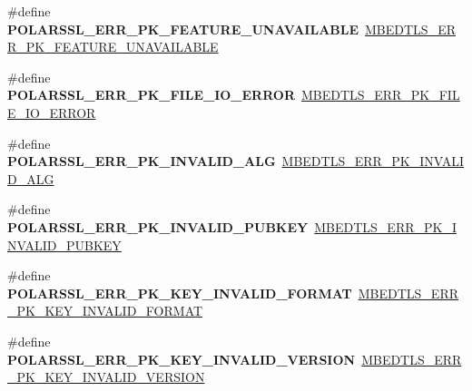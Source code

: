 \begin{DoxyCompactItemize}
\item 
\mbox{\label{compat-1_83_8h_a37a8bde8e3ed0443bba504a22e83045c}} 
\#define {\bfseries P\+O\+L\+A\+R\+S\+S\+L\+\_\+\+E\+R\+R\+\_\+\+P\+K\+\_\+\+F\+E\+A\+T\+U\+R\+E\+\_\+\+U\+N\+A\+V\+A\+I\+L\+A\+B\+LE}~\mbox{\hyperlink{pk_8h_af4a79b15d48bd86c96767db4b9ce2caf}{M\+B\+E\+D\+T\+L\+S\+\_\+\+E\+R\+R\+\_\+\+P\+K\+\_\+\+F\+E\+A\+T\+U\+R\+E\+\_\+\+U\+N\+A\+V\+A\+I\+L\+A\+B\+LE}}
\item 
\mbox{\label{compat-1_83_8h_a5e35817e1086ccdf611600128561281c}} 
\#define {\bfseries P\+O\+L\+A\+R\+S\+S\+L\+\_\+\+E\+R\+R\+\_\+\+P\+K\+\_\+\+F\+I\+L\+E\+\_\+\+I\+O\+\_\+\+E\+R\+R\+OR}~\mbox{\hyperlink{pk_8h_a334a28580efaab3c749fdf1dde28feb8}{M\+B\+E\+D\+T\+L\+S\+\_\+\+E\+R\+R\+\_\+\+P\+K\+\_\+\+F\+I\+L\+E\+\_\+\+I\+O\+\_\+\+E\+R\+R\+OR}}
\item 
\mbox{\label{compat-1_83_8h_a3f006a0485438e073549d87796d450cc}} 
\#define {\bfseries P\+O\+L\+A\+R\+S\+S\+L\+\_\+\+E\+R\+R\+\_\+\+P\+K\+\_\+\+I\+N\+V\+A\+L\+I\+D\+\_\+\+A\+LG}~\mbox{\hyperlink{pk_8h_a5d71f30a40d67d5d205a20b69303a341}{M\+B\+E\+D\+T\+L\+S\+\_\+\+E\+R\+R\+\_\+\+P\+K\+\_\+\+I\+N\+V\+A\+L\+I\+D\+\_\+\+A\+LG}}
\item 
\mbox{\label{compat-1_83_8h_ae336dc80d29e6aa980b776b54647f443}} 
\#define {\bfseries P\+O\+L\+A\+R\+S\+S\+L\+\_\+\+E\+R\+R\+\_\+\+P\+K\+\_\+\+I\+N\+V\+A\+L\+I\+D\+\_\+\+P\+U\+B\+K\+EY}~\mbox{\hyperlink{pk_8h_a0fdf1044cce5beb387d76d19bf4ef0a2}{M\+B\+E\+D\+T\+L\+S\+\_\+\+E\+R\+R\+\_\+\+P\+K\+\_\+\+I\+N\+V\+A\+L\+I\+D\+\_\+\+P\+U\+B\+K\+EY}}
\item 
\mbox{\label{compat-1_83_8h_a0af52f107aa8ae7b6e31facfd18ff44b}} 
\#define {\bfseries P\+O\+L\+A\+R\+S\+S\+L\+\_\+\+E\+R\+R\+\_\+\+P\+K\+\_\+\+K\+E\+Y\+\_\+\+I\+N\+V\+A\+L\+I\+D\+\_\+\+F\+O\+R\+M\+AT}~\mbox{\hyperlink{pk_8h_a291c7d21aa2cd94b2100703e8e3a1d06}{M\+B\+E\+D\+T\+L\+S\+\_\+\+E\+R\+R\+\_\+\+P\+K\+\_\+\+K\+E\+Y\+\_\+\+I\+N\+V\+A\+L\+I\+D\+\_\+\+F\+O\+R\+M\+AT}}
\item 
\mbox{\label{compat-1_83_8h_a025c4150348004b381eeb5881737b77a}} 
\#define {\bfseries P\+O\+L\+A\+R\+S\+S\+L\+\_\+\+E\+R\+R\+\_\+\+P\+K\+\_\+\+K\+E\+Y\+\_\+\+I\+N\+V\+A\+L\+I\+D\+\_\+\+V\+E\+R\+S\+I\+ON}~\mbox{\hyperlink{pk_8h_a9b589f81143439f8580b3004dc8ecaf1}{M\+B\+E\+D\+T\+L\+S\+\_\+\+E\+R\+R\+\_\+\+P\+K\+\_\+\+K\+E\+Y\+\_\+\+I\+N\+V\+A\+L\+I\+D\+\_\+\+V\+E\+R\+S\+I\+ON}}

\end{DoxyCompactItemize}
